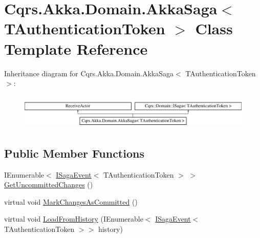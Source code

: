 \hypertarget{classCqrs_1_1Akka_1_1Domain_1_1AkkaSaga}{}\section{Cqrs.\+Akka.\+Domain.\+Akka\+Saga$<$ T\+Authentication\+Token $>$ Class Template Reference}
\label{classCqrs_1_1Akka_1_1Domain_1_1AkkaSaga}
Inheritance diagram for Cqrs.\+Akka.\+Domain.\+Akka\+Saga$<$ T\+Authentication\+Token $>$\+:\begin{figure}[H]
\begin{center}
\leavevmode
\includegraphics[height=1.696970cm]{classCqrs_1_1Akka_1_1Domain_1_1AkkaSaga}
\end{center}
\end{figure}
\subsection*{Public Member Functions}
\begin{DoxyCompactItemize}
\item 
I\+Enumerable$<$ \hyperlink{interfaceCqrs_1_1Events_1_1ISagaEvent}{I\+Saga\+Event}$<$ T\+Authentication\+Token $>$ $>$ \hyperlink{classCqrs_1_1Akka_1_1Domain_1_1AkkaSaga_ac88061e29e3e2223db31ce9075835b46}{Get\+Uncommitted\+Changes} ()
\item 
virtual void \hyperlink{classCqrs_1_1Akka_1_1Domain_1_1AkkaSaga_a83269fac4653cca097461e924feaea7f}{Mark\+Changes\+As\+Committed} ()
\item 
virtual void \hyperlink{classCqrs_1_1Akka_1_1Domain_1_1AkkaSaga_a40b859bc15c2f7c87a21b07f9bc9548c}{Load\+From\+History} (I\+Enumerable$<$ \hyperlink{interfaceCqrs_1_1Events_1_1ISagaEvent}{I\+Saga\+Event}$<$ T\+Authentication\+Token $>$$>$ history)
\end{DoxyCompactItemize}
